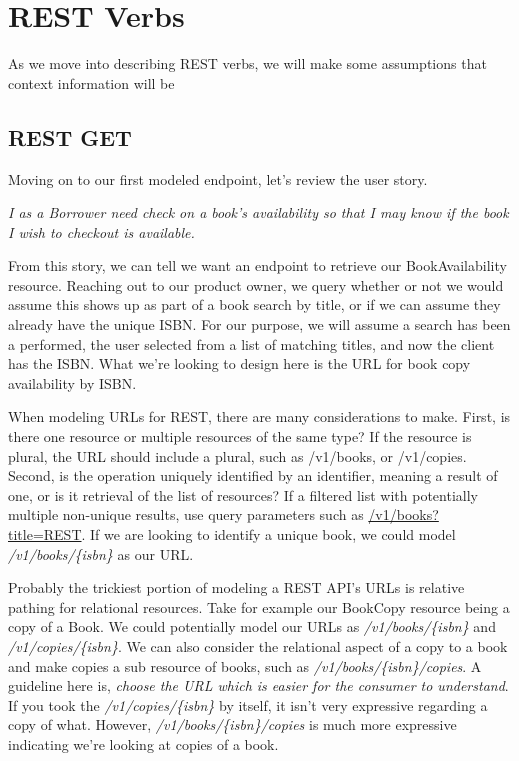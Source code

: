 \chapter{REST Verbs}

As we move into describing REST verbs, we will make some assumptions that context information will be

\section{REST GET}

Moving on to our first modeled endpoint, let's review the user story.

\textit{I as a Borrower need check on a book's availability so that I may know if the book I wish to checkout is available.}

From this story, we can tell we want an endpoint to retrieve our BookAvailability resource.  Reaching out to our product owner, we query whether or not we would assume this shows up as part of a book search by title, or if we can assume they already have the unique ISBN.  For our purpose, we will assume a search has been a performed, the user selected from a list of matching titles, and now the client has the ISBN.  What we're looking to design here is the URL for book copy availability by ISBN.

When modeling URLs for REST, there are many considerations to make.  First, is there one resource or multiple resources of the same type?  If the resource is plural, the URL should include a plural, such as /v1/books, or /v1/copies.  Second, is the operation uniquely identified by an identifier, meaning a result of one, or is it retrieval of the list of resources?  If a filtered list with potentially multiple non-unique results, use query parameters such as \url{/v1/books?title=REST}.  If we are looking to identify a unique book, we could model \textit{/v1/books/\{isbn\}} as our URL.

Probably the trickiest portion of modeling a REST API's URLs is relative pathing for relational resources.  Take for example our BookCopy resource being a copy of a Book.  We could potentially model our URLs as \textit{/v1/books/\{isbn\}} and \textit{/v1/copies/\{isbn\}}.  We can also consider the relational aspect of a copy to a book and make copies a sub resource of books, such as \textit{/v1/books/\{isbn\}/copies}.  A guideline here is, \textit{choose the URL which is easier for the consumer to understand}.  If you took the \textit{/v1/copies/\{isbn\}} by itself, it isn't very expressive regarding a copy of what.  However, \textit{/v1/books/\{isbn\}/copies} is much more expressive indicating we're looking at copies of a book.

